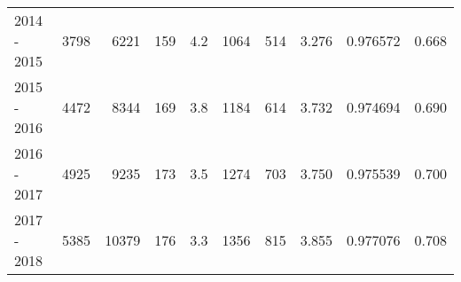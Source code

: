 \begin{tabular}{lrrrrrrrlr}
2014 - 2015 &     3798 &     6221 &               159 &               4.2 &                    1064 &                        514 &       3.276 &   0.976572 &             0.668 \\
2015 - 2016 &     4472 &     8344 &               169 &               3.8 &                    1184 &                        614 &       3.732 &   0.974694 &             0.690 \\
2016 - 2017 &     4925 &     9235 &               173 &               3.5 &                    1274 &                        703 &       3.750 &   0.975539 &             0.700 \\
2017 - 2018 &     5385 &    10379 &               176 &               3.3 &                    1356 &                        815 &       3.855 &   0.977076 &             0.708 \\
\bottomrule
\end{tabular}
